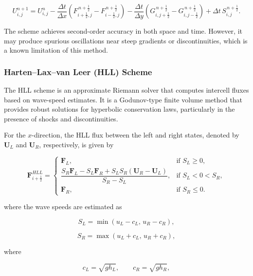 \documentclass[12pt]{article}
\begin{document}
\begin{equation}
U_{i,j}^{n+1}
=
U_{i,j}^{n}
-
\frac{\Delta t}{\Delta x}
\left(
F_{i+\frac{1}{2},j}^{\,n+\frac{1}{2}}
-
F_{i-\frac{1}{2},j}^{\,n+\frac{1}{2}}
\right)
-
\frac{\Delta t}{\Delta y}
\left(
G_{i,j+\frac{1}{2}}^{\,n+\frac{1}{2}}
-
G_{i,j-\frac{1}{2}}^{\,n+\frac{1}{2}}
\right)
+
\Delta t\,S_{i,j}^{\,n+\frac{1}{2}}.
\end{equation}

The scheme achieves second-order accuracy in both space and time. However, it may produce spurious oscillations near steep gradients or discontinuities, which is a known limitation of this method.

\subsubsection{Harten--Lax--van Leer (HLL) Scheme}

The HLL scheme is an approximate Riemann solver that computes intercell fluxes based on wave-speed estimates. It is a Godunov-type finite volume method that provides robust solutions for hyperbolic conservation laws, particularly in the presence of shocks and discontinuities.

For the $x$-direction, the HLL flux between the left and right states, denoted by $\mathbf{U}_L$ and $\mathbf{U}_R$, respectively, is given by

\begin{equation}
\mathbf{F}_{i+\frac{1}{2}}^{HLL}=
\begin{cases}
\mathbf{F}_L, & \text{if } S_L \geq 0, \\[2mm]
\dfrac{S_R\mathbf{F}_L-S_L\mathbf{F}_R+S_LS_R(\mathbf{U}_R-\mathbf{U}_L)}
{S_R-S_L}, & \text{if } S_L<0<S_R, \\[3mm]
\mathbf{F}_R, & \text{if } S_R \leq 0.
\end{cases}
\end{equation}

where the wave speeds are estimated as

\begin{equation}
S_L=\min\left(u_L-c_L,\,u_R-c_R\right),
\end{equation}

\begin{equation}
S_R=\max\left(u_L+c_L,\,u_R+c_R\right),
\end{equation}

where

\begin{equation}
c_L=\sqrt{gh_L},
\qquad
c_R=\sqrt{gh_R},
\end{equation}
\end{document}

